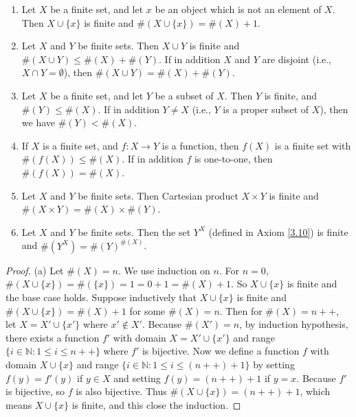 \begin{proposition}\label{proposition 3.6.3}
\leavevmode
\begin{enumerate}
    \item Let \(X\) be a finite set, and let \(x\) be an object which is not an element of \(X\).
    Then \(X \cup \{x\}\) is finite and \(\#(X \cup \{x\}) = \#(X) + 1\).
    \item Let \(X\) and \(Y\) be finite sets.
    Then \(X \cup Y\) is finite and \(\#(X \cup Y) \leq \#(X) + \#(Y)\).
    If in addition \(X\) and \(Y\) are disjoint (i.e., \(X \cap Y = \emptyset\)), then \(\#(X \cup Y) = \#(X) + \#(Y)\).
    \item Let \(X\) be a finite set, and let \(Y\) be a subset of \(X\).
    Then \(Y\) is finite, and \(\#(Y) \leq \#(X)\).
    If in addition \(Y \neq X\) (i.e., \(Y\) is a proper subset of \(X\)), then we have \(\#(Y) < \#(X)\).
    \item If \(X\) is a finite set, and \(f : X \to Y\) is a function, then \(f(X)\) is a finite set with \(\#(f(X)) \leq \#(X)\).
    If in addition \(f\) is one-to-one, then \(\#(f(X)) = \#(X)\).
    \item Let \(X\) and \(Y\) be finite sets.
    Then Cartesian product \(X \times Y\) is finite and \(\#(X \times Y) = \#(X) \times \#(Y)\).
    \item Let \(X\) and \(Y\) be finite sets.
    Then the set \(Y^X\) (defined in Axiom \ref{3.10}) is finite and \(\#(Y^X) = \#(Y)^{\#(X)}\).
\end{enumerate}
\end{proposition}

\begin{proof}{(a)}
Let \(\#(X) = n\).
We use induction on \(n\).
For \(n = 0\), \(\#(X \cup \{x\}) = \#(\{x\}) = 1 = 0 + 1 = \#(X) + 1\).
So \(X \cup \{x\}\) is finite and the base case holds.
Suppose inductively that \(X \cup \{x\}\) is finite and \(\#(X \cup \{x\}) = \#(X) + 1\) for some \(\#(X) = n\).
Then for \(\#(X) = n++\), let \(X = X' \cup \{x'\}\) where \(x' \notin X'\).
Because \(\#(X') = n\), by induction hypothesis, there exists a function \(f'\) with domain \(X = X' \cup \{x'\}\) and range \(\{i \in \mathds{N} : 1 \leq i \leq n++\}\) where \(f'\) is bijective.
Now we define a function \(f\) with domain \(X \cup \{x\}\) and range \(\{i \in \mathds{N} : 1 \leq i \leq (n++) + 1\}\) by setting \(f(y) = f'(y)\) if \(y \in X\) and setting \(f(y) = (n++) + 1\) if \(y = x\).
Because \(f'\) is bijective, so \(f\) is also bijective.
Thus \(\#(X \cup \{x\}) = (n++) + 1\), which means \(X \cup \{x\}\) is finite, and this close the induction.
\end{proof}


